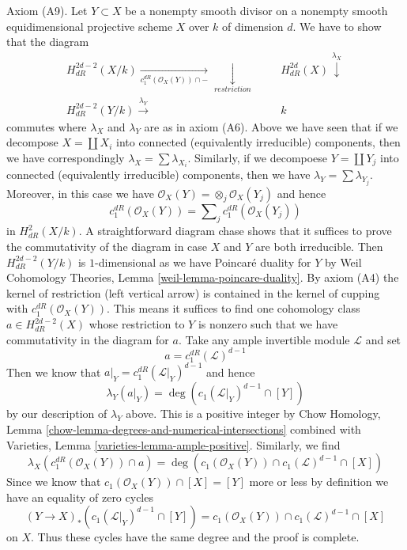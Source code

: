 \medskip\noindent
Axiom (A9). Let $Y \subset X$ be a nonempty smooth divisor on a
nonempty smooth equidimensional projective scheme $X$ over $k$
of dimension $d$. We have to show that the diagram
$$
\begin{array}{cccc}H_{dR}^{2d - 2}(X/k)
\underset{c^{dR}_1(\mathcal{O}_X(Y)) \cap -}{\longrightarrow}\underset{restriction}{\downarrow} &  &  & H_{dR}^{2d}(X) \overset{\lambda_X}{\downarrow} \\ H_{dR}^{2d - 2}(Y/k) \overset{\lambda_Y}{\longrightarrow} &  &  & k\end{array}
$$
commutes where $\lambda_X$ and $\lambda_Y$ are as in axiom (A6).
Above we have seen that if we decompose $X = \coprod X_i$ into connected
(equivalently irreducible) components, then
we have correspondingly $\lambda_X = \sum \lambda_{X_i}$.
Similarly, if we decompoese $Y = \coprod Y_j$ into connected (equivalently
irreducible) components, then we have $\lambda_Y = \sum \lambda_{Y_j}$.
Moreover, in this case we have
$\mathcal{O}_X(Y) = \otimes_j \mathcal{O}_X(Y_j)$ and hence
$$
c_1^{dR}(\mathcal{O}_X(Y)) = \sum\nolimits_j
c^{dR}_1(\mathcal{O}_X(Y_j))
$$
in $H_{dR}^2(X/k)$. A straightforward diagram chase shows that it suffices
to prove the commutativity of the diagram in case $X$ and $Y$ are both
irreducible. Then $H_{dR}^{2d - 2}(Y/k)$ is $1$-dimensional as
we have Poincar\'e duality for $Y$ by
Weil Cohomology Theories, Lemma \ref{weil-lemma-poincare-duality}.
By axiom (A4) the kernel of restriction (left vertical arrow)
is contained in the kernel of cupping with $c^{dR}_1(\mathcal{O}_X(Y))$.
This means it suffices to find one cohomology class
$a \in H_{dR}^{2d - 2}(X)$ whose restriction to $Y$ is nonzero
such that we have commutativity in the diagram for $a$.
Take any ample invertible module $\mathcal{L}$ and set
$$
a = c^{dR}_1(\mathcal{L})^{d - 1}
$$
Then we know that $a|_Y = c^{dR}_1(\mathcal{L}|_Y)^{d - 1}$
and hence
$$
\lambda_Y(a|_Y) = \deg(c_1(\mathcal{L}|_Y)^{d - 1} \cap [Y])
$$
by our description of $\lambda_Y$ above. This is a positive integer
by Chow Homology, Lemma
\ref{chow-lemma-degrees-and-numerical-intersections} combined with
Varieties, Lemma \ref{varieties-lemma-ample-positive}.
Similarly, we find
$$
\lambda_X(c^{dR}_1(\mathcal{O}_X(Y)) \cap a) =
\deg(c_1(\mathcal{O}_X(Y)) \cap c_1(\mathcal{L})^{d - 1} \cap [X])
$$
Since we know that $c_1(\mathcal{O}_X(Y)) \cap [X] = [Y]$ more or
less by definition we have an equality of zero cycles
$$
(Y \to X)_*\left(c_1(\mathcal{L}|_Y)^{d - 1} \cap [Y]\right) =
c_1(\mathcal{O}_X(Y)) \cap c_1(\mathcal{L})^{d - 1} \cap [X]
$$
on $X$. Thus these cycles have the same degree and the proof is complete.

